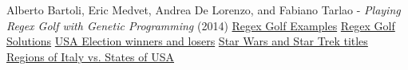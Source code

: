 \documentclass{article}
\begin{document}
\newpage
{}
\begin{thebibliography}{9}
Alberto Bartoli, Eric Medvet, Andrea De Lorenzo, and Fabiano Tarlao - 
\textit{Playing Regex Golf with Genetic Programming} (2014)
\href{https://alf.nu/RegexGolf}{Regex Golf Examples}
\href{https://gist.github.com/Davidebyzero/9221685}{Regex Golf Solutions}
\href{https://pastebin.com/EvycCQTB}{USA Election winners and losers}
\href{http://zegnat.github.io/xkcd1313/}{Star Wars and Star Trek titles}
\href{https://codegolf.stackexchange.com/questions/17855/regex-golf-regions-of-italy-vs-states-of-usa}{Regions of Italy vs. States of USA}

\end{thebibliography}
\end{document}
